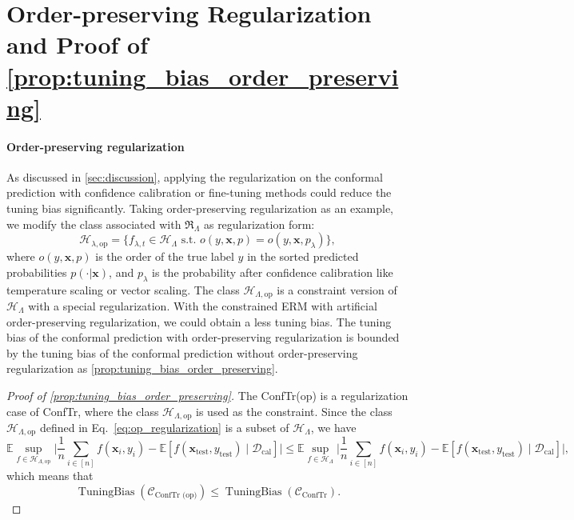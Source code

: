 \documentclass{article}
\newcommand{\E}{\mathbb{E}}
\newcommand{\1}{\mathbbm{1}}
\newcommand{\Eqref}[1]{Eq.~\eqref{#1}}
\newcommand{\TuningBias}{\mathop{\text{TuningBias}}}
\theoremstyle{plain}
\theoremstyle{definition}
\theoremstyle{remark}
\begin{document}
\section{Order-preserving Regularization and Proof of \cref{prop:tuning_bias_order_preserving}}
\label{sec:proof_tuning_bias_order_preserving}
\paragraph{Order-preserving regularization} 
As discussed in \cref{sec:discussion}, applying the regularization on the conformal prediction with confidence calibration or fine-tuning methods could reduce the tuning bias significantly. 
Taking order-preserving regularization as an example, we modify the class associated with \(\mathfrak{R}_{\Lambda}\) as regularization form:
\begin{equation}
    \label{eq:op_regularization}
    \mathcal{H}_{\lambda, \text{op}} = \{ f_{\lambda, t} \in \mathcal{H}_{\Lambda} \text{ s.t. }  o(y, \boldsymbol{x}, p) = o(y, \boldsymbol{x}, p_\lambda) \},
\end{equation}
where \(o(y, \boldsymbol{x}, p)\) is the order of the true label \(y\) in the sorted predicted probabilities \(p(\cdot|\boldsymbol{x})\), and \(p_\lambda\) is the probability after confidence calibration like temperature scaling or vector scaling. 
The class \(\mathcal{H}_{\Lambda, \text{op}}\) is a constraint version of \(\mathcal{H}_{\Lambda}\) with a special regularization. 
With the constrained ERM with artificial order-preserving regularization, we could obtain a less tuning bias. 
The tuning bias of the conformal prediction with order-preserving regularization is bounded by the tuning bias of the conformal prediction without order-preserving regularization as \cref{prop:tuning_bias_order_preserving}.
\begin{proof}[Proof of \cref{prop:tuning_bias_order_preserving}]
    The ConfTr(op) is a regularization case of ConfTr, where the class \(\mathcal{H}_{\Lambda, \text{op}}\) is used as the constraint. 
    Since the class \(\mathcal{H}_{\Lambda, \text{op}}\) defined in \Eqref{eq:op_regularization} is a subset of \(\mathcal{H}_{\Lambda}\), we have
    \begin{equation*}
        \E \sup_{f \in \mathcal{H}_{\Lambda, \text{op}}} \Big|
        \frac{1}{n} \sum_{i \in [n]} f(\boldsymbol{x}_i, y_i) - \E[f(\boldsymbol{x}_{\text{test}}, y_{\text{test}}) \mid \mathcal{D}_{\text{cal}}]
        \Big|
        \leq \E \sup_{f \in \mathcal{H}_{\Lambda}} \Big|
        \frac{1}{n} \sum_{i \in [n]} f(\boldsymbol{x}_i, y_i) - \E[f(\boldsymbol{x}_{\text{test}}, y_{\text{test}}) \mid \mathcal{D}_{\text{cal}}]
        \Big|,
    \end{equation*}
    which means that 
    \begin{equation*}
        \TuningBias({\mathcal{C}}_{\text{ConfTr (op)}}) \leq \TuningBias({\mathcal{C}}_{\text{ConfTr}}).
    \end{equation*}
\end{proof}
\end{document}
